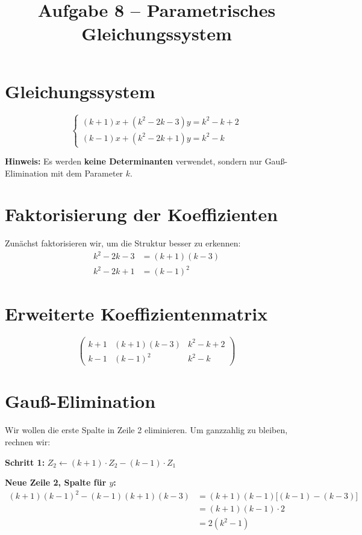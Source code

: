 \documentclass[a4paper,12pt]{article}
\title{Aufgabe 8 -- Parametrisches Gleichungssystem}
\author{}
\date{}
\begin{document}
\maketitle

\section*{Gleichungssystem}

\[
\begin{cases}
(k+1)x + (k^2-2k-3)y = k^2-k+2 \\
(k-1)x + (k^2-2k+1)y = k^2-k
\end{cases}
\]

\textbf{Hinweis:} Es werden \textbf{keine Determinanten} verwendet, sondern nur Gauß-Elimination mit dem Parameter $k$.

\section*{Faktorisierung der Koeffizienten}

Zunächst faktorisieren wir, um die Struktur besser zu erkennen:
\begin{align*}
k^2-2k-3 &= (k+1)(k-3) \\
k^2-2k+1 &= (k-1)^2
\end{align*}

\section*{Erweiterte Koeffizientenmatrix}

\[
\left(\begin{array}{cc|c}
k+1 & (k+1)(k-3) & k^2-k+2 \\
k-1 & (k-1)^2 & k^2-k
\end{array}\right)
\]

\section*{Gauß-Elimination}

Wir wollen die erste Spalte in Zeile 2 eliminieren. Um ganzzahlig zu bleiben, rechnen wir:

\textbf{Schritt 1:} $Z_2 \leftarrow (k+1) \cdot Z_2 - (k-1) \cdot Z_1$

\textbf{Neue Zeile 2, Spalte für $y$:}
\begin{align*}
(k+1)(k-1)^2 - (k-1)(k+1)(k-3) &= (k+1)(k-1)\big[(k-1) - (k-3)\big] \\
&= (k+1)(k-1) \cdot 2 \\
&= 2(k^2-1)
\end{align*}
\end{document}
